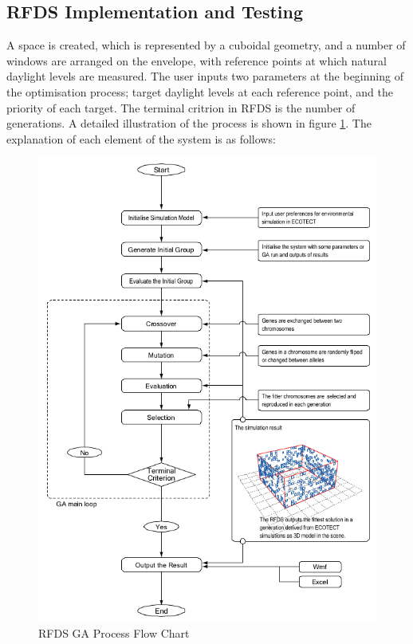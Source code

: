 \subsection{RFDS Implementation and Testing}

A space is created, which is represented by a cuboidal geometry, and a number of windows are arranged on the envelope, with reference points at which natural daylight levels are measured. The user inputs two parameters at the beginning of the optimisation process; target daylight levels at each reference point, and the priority of each target. The terminal critrion in RFDS is the number of generations. A detailed illustration of the process is shown in figure \ref{kawakitaGA}. The explanation of each element of the system is as follows:

\begin{figure}[hbtp]
\centering
\includegraphics[width=\textwidth]{../Chapter3/Images/16-kawakitaGA}
\caption[RFDS GA Process Flow Chart]{RFDS GA Process Flow Chart \cite{kawakita08}}
\label{kawakitaGA}
\end{figure}


